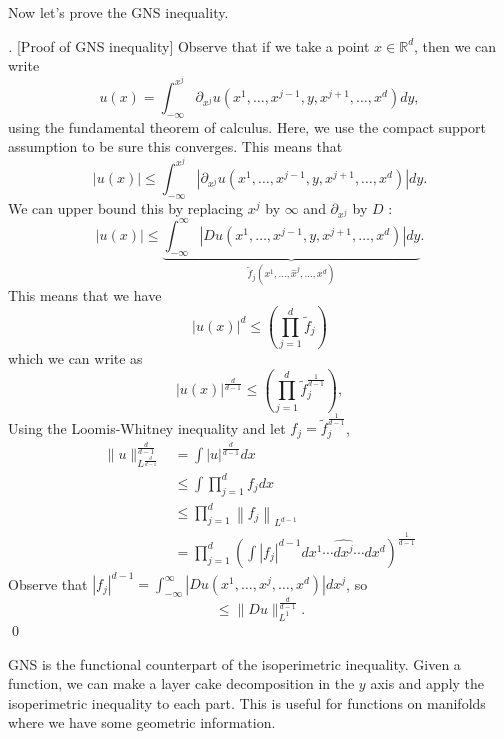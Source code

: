 Now let's prove the GNS inequality. 
\vspace{2em}
\begin{proof}[][Proof of GNS inequality]
 Observe that if we take a point $x \in \mathbb{R}^{d}$, then we can write
$$
u(x)=\int_{-\infty}^{x^{j}} \partial_{x^{j}} u\left(x^{1}, \ldots, x^{j-1}, y, x^{j+1}, \ldots, x^{d}\right) d y,
$$
using the fundamental theorem of calculus. Here, we use the compact support assumption to be sure this converges. This means that
$$
|u(x)| \leq \int_{-\infty}^{x^{j}}\left|\partial_{x^{j}} u\left(x^{1}, \ldots, x^{j-1}, y, x^{j+1}, \ldots, x^{d}\right)\right| d y .
$$
We can upper bound this by replacing $x^{j}$ by $\infty$ and $\partial_{x^{j}}$ by $D$ :
$$
|u(x)| \leq \underbrace{\int_{-\infty}^{\infty}\left|D u\left(x^{1}, \ldots, x^{j-1}, y, x^{j+1}, \ldots, x^{d}\right)\right| d y}_{\tilde{f}_{j}\left(x^{1}, \ldots, \widehat{x}^{j}, \ldots, x^{d}\right)} .
$$
This means that we have
$$
|u(x)|^d \leq\left(\prod_{j=1}^{d} \widetilde{f}_{j}\right)
$$
which we can write as
$$
|u(x)|^{\frac{d}{d-1}} \leq\left(\prod_{j=1}^{d} \widetilde{f}_{j}^{\frac{1}{d-1}}\right),
$$
Using the Loomis-Whitney inequality and let $ f_j = \tilde f_j^{\frac{1}{d-1}} $,
$$ 
\begin{aligned}
\|u\|_{L^{\frac{d}{d-1}}}^{\frac{d}{d-1}} &=\int|u|^{\frac{d}{d-1}} d x \\
& \leq \int \prod_{j=1}^{d} f_{j} d x \\
& \leq \prod_{j=1}^{d}\left\|f_{j}\right\|_{L^{d-1}} \\
&=\prod_{j=1}^{d}\left(\int\left|f_{j}\right|^{d-1} d x^{1} \cdots \widehat{d x^{j}} \cdots d x^{d}\right)^{\frac{1}{d-1}}
\end{aligned}
$$
Observe that $\left|f_{j}\right|^{d-1}=\int_{-\infty}^{\infty}\left|D u\left(x^{1}, \ldots, x^{j}, \ldots, x^{d}\right)\right| d x^{j}$, so
$$
\leq\|D u\|_{L^{1}}^{\frac{d}{d-1}} .
$$
\qed
\end{proof}
\begin{remark}
    GNS is the functional counterpart of the isoperimetric inequality. Given a function, we can make a layer cake decomposition in the $y$ axis and apply the isoperimetric inequality to each part. This is useful for functions on manifolds where we have some geometric information.
\end{remark}

